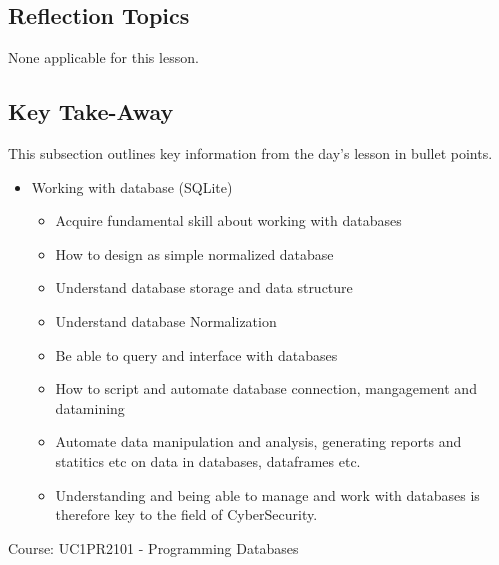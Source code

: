 {\subsection{Reflection Topics}

None applicable for this lesson.




\subsection{Key Take-Away}

This subsection outlines key information from the day's lesson in bullet points.


\begin{itemize}
    \item Working with database (SQLite)
        \begin{itemize}
            \item Acquire fundamental skill about working with databases
            \item How to design as simple normalized database
            \item Understand database storage and data structure
            \item Understand database Normalization
            \item Be able to query and interface with databases
            \item How to script and automate database connection, mangagement and datamining
            \item Automate data manipulation and analysis, generating reports and statitics etc on data in databases, dataframes etc.
            \item Understanding and being able to manage and  work with databases is therefore key to the field of CyberSecurity.
        \end{itemize}
\end{itemize}


Course: UC1PR2101 - Programming Databases


}
